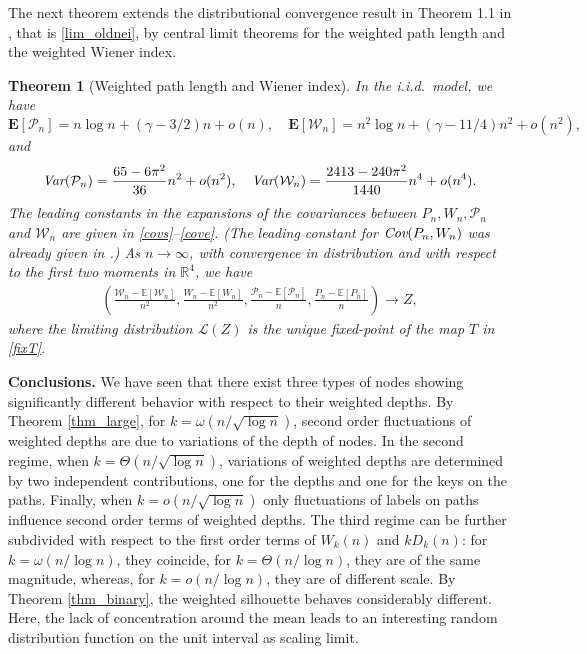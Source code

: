 \documentclass{amsart}       %
\newcommand{\Ew}{\ensuremath{\mathcal P}}
\newcommand{\Ww}{\ensuremath{\mathcal W}}
\newcommand{\R}{\ensuremath{\mathbb{R}}}
\newcommand{\E}[1]{\ensuremath{\mathbf{E} \left[#1 \right]}}
\newcommand{\Law}{\mathcal{L}}
\newtheorem{theorem}{Theorem}
\begin{document}
The next theorem extends the distributional convergence result in Theorem 1.1 in \cite{newiener}, that is \eqref{lim_oldnei},  by central limit theorems for the weighted path length and the weighted Wiener index.
\begin{theorem}[Weighted path length and Wiener index] \label{thm_pathlength}
In the i.i.d.\ model, we have 
$$ \E{\Ew_n}  = n \log n  + (\gamma - 3/2) n + o(n), \quad \E{\Ww_n} =  n^2 \log n + (\gamma -11/4)n^2 + o(n^2), $$
and 
\begin{align*}
\emph{Var}(\Ew_n) =   \frac{65 - 6 \pi^2}{36} n^2 + o(n^2), \quad \emph{Var}(\Ww_n) = \frac{2413 - 240 \pi^2}{1440} n^4 + o(n^4).
\end{align*}
The leading constants in the expansions of the covariances between $P_n, W_n, \Ew_n$ and $\Ww_n$ are given in \eqref{covs}--\eqref{cove}. (The leading constant for $\emph{Cov}(P_n, W_n)$ was already given in \cite{newiener}.)
As $n \to \infty$, with convergence in distribution and with respect to the first two moments in $\R^4$, we have
\begin{align*}
\left(\frac{\Ww_n-\mathbb{E}[\Ww_n]}{n^2},\frac{W_n-\mathbb{E}[W_n]}{n^2},\frac{\Ew_n-\mathbb{E}[\Ew_n]}{n},\frac{P_n-\mathbb{E}[P_n]}{n}\right) \to Z, 
\end{align*}
where the limiting distribution $\Law(Z)$ is the unique fixed-point of the map $T$ in \eqref{fixT}.
\end{theorem}

\textbf{Conclusions.} We have seen that there exist three types of nodes showing significantly different behavior with respect to their weighted depths.
By Theorem \ref{thm_large},  for $k = \omega(n/\sqrt{\log n})$,  second order fluctuations of weighted depths
are due to variations of the depth of nodes. 
In the second regime, when $k = \Theta(n/\sqrt{\log n})$, variations of weighted depths are determined by two independent contributions, one for the depths and one for the keys on the paths. Finally,  when $k = o(n/\sqrt{\log n})$ only fluctuations of labels on
paths influence second order terms of weighted depths. The third regime can be further subdivided with respect to the first order terms  of $W_k(n)$ and $k D_k(n)$: for $k = \omega(n / \log n)$, they coincide, for $k = \Theta(n/\log n)$, they are of the same magnitude, whereas, for $k = o(n/ \log n)$, they are of different scale.
By Theorem \ref{thm_binary}, the weighted silhouette behaves considerably different. Here, the lack of concentration around the mean leads to an interesting random distribution function on the unit interval as scaling limit.
\end{document}
